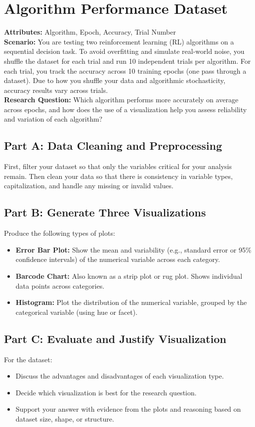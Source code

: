 \section{Algorithm Performance Dataset}

{\bf Attributes:} Algorithm, Epoch, Accuracy, Trial Number\\

{\bf Scenario:} You are testing two reinforcement learning (RL) algorithms on a sequential decision task. To avoid overfitting and simulate real-world noise, you shuffle the dataset for each trial and run 10 independent trials per algorithm. For each trial, you track the accuracy across 10 training epochs (one pass through a dataset). Due to how you shuffle your data and algorithmic stochasticity, accuracy results vary across trials.\\

{\bf  Research Question:} Which algorithm performs more accurately on average across epochs, and how does the use of a visualization help you assess reliability and variation of each algorithm?

\subsection{Part A: Data Cleaning and Preprocessing}
First, filter your dataset so that only the variables critical for your analysis remain. Then clean your data so that there is consistency in variable types, capitalization, and handle any missing or invalid values.

\subsection{Part B: Generate Three Visualizations}
Produce the following types of plots:
\begin{itemize}
    \item \textbf{Error Bar Plot:} Show the mean and variability (e.g., standard error or 95\% confidence intervals) of the numerical variable across each category.
    \item \textbf{Barcode Chart:} Also known as a strip plot or rug plot. Shows individual data points across categories.
    \item \textbf{Histogram:} Plot the distribution of the numerical variable, grouped by the categorical variable (using hue or facet).
\end{itemize}

\subsection{Part C: Evaluate and Justify Visualization}
For the dataset:
\begin{itemize}
    \item Discuss the advantages and disadvantages of each visualization type.
    \item Decide which visualization is best for the research question.
    \item Support your answer with evidence from the plots and reasoning based on dataset size, shape, or structure.
\end{itemize}
